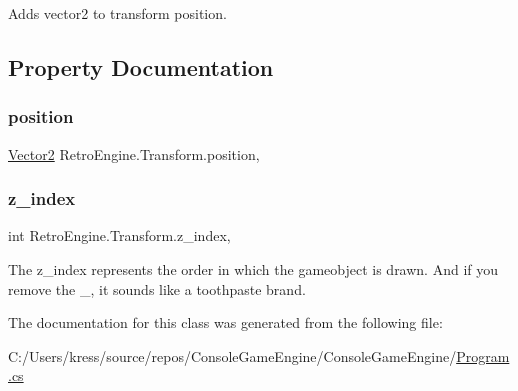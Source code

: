 \textquotesingle{}Adds\textquotesingle{} vector2 to transform position. 



\subsection{Property Documentation}
\mbox{\label{class_retro_engine_1_1_transform_ad0bee31ec3e08d642ca8c140f088a09f}} 
\subsubsection{\texorpdfstring{position}{position}}
{\footnotesize\ttfamily \mbox{\hyperlink{struct_retro_engine_1_1_vector2}{Vector2}} Retro\+Engine.\+Transform.\+position\hspace{0.3cm}{\ttfamily [get]}, {\ttfamily [set]}}

\mbox{\label{class_retro_engine_1_1_transform_ab9648923b6e3eb8a7a30204ceb40f959}} 
\subsubsection{\texorpdfstring{z\_index}{z\_index}}
{\footnotesize\ttfamily int Retro\+Engine.\+Transform.\+z\+\_\+index\hspace{0.3cm}{\ttfamily [get]}, {\ttfamily [set]}}



The z\+\_\+index represents the order in which the gameobject is drawn. And if you remove the \textquotesingle{}\+\_\+\textquotesingle{}, it sounds like a toothpaste brand. 



The documentation for this class was generated from the following file\+:\begin{DoxyCompactItemize}
\item 
C\+:/\+Users/kress/source/repos/\+Console\+Game\+Engine/\+Console\+Game\+Engine/\mbox{\hyperlink{_program_8cs}{Program.\+cs}}\end{DoxyCompactItemize}
